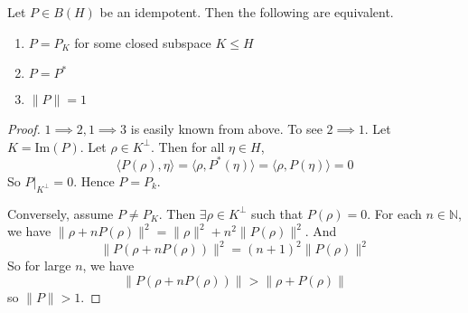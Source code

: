 \begin{theorem}
  Let $P \in B(H)$ be an idempotent. Then the following are equivalent.
  \begin{enumerate}[label=(\arabic*)]
    \item $P = P_K$ for some closed subspace $K \leqslant H$
    \item $P = P^*$
    \item $\|P\| = 1$
  \end{enumerate}
\end{theorem}
\begin{proof}
  $1 \implies 2, 1 \implies 3$ is easily known from above.
  To see $2 \implies 1$. Let $K = \textrm{Im}(P)$. Let $\rho \in
  K^\perp$. Then for all $\eta \in H$, \[
    \langle P(  \rho) ,  \eta \rangle  = \langle \rho ,  P^*(\eta)
    \rangle  = \langle \rho ,  P(\eta) \rangle = 0
  \]
  So $P|_{K^\perp} = 0$. Hence $P = P_k$.

  Conversely, assume $P \neq P_K$. Then $\exists \rho \in K^\perp$
  such that $P(\rho) = 0$. For each $n \in \mathbb{N}$, we have
  $\|\rho + n P(\rho)\|^2 = \|\rho\|^2 + n^2 \|P(\rho)\|^2$. And \[
    \|P(\rho + n P(\rho))\|^2 = (n+1)^2 \|P(\rho)\|^2
  \]
  So for large $n$, we have \[
    \|P(\rho + n P(\rho))\| > \|\rho + P(\rho)\|
  \]
  so $\|P\| > 1$.
\end{proof}

